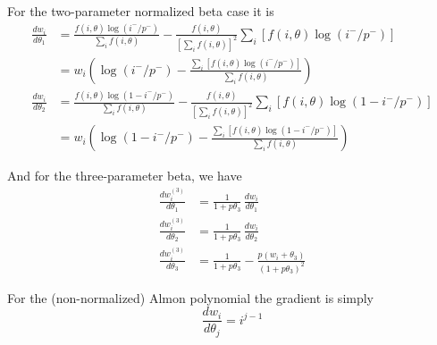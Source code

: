 \documentclass{article}
\begin{document}
For the two-parameter normalized beta case it is
\begin{align*}
\frac{dw_i}{d\theta_1} &=
\frac{f(i,\theta) \log(i^-/p^-)}{\sum_i f(i, \theta)} -
\frac{f(i,\theta)}{\left[\sum_i f(i,\theta)\right]^2}
\sum_i\left[f(i,\theta) \log(i^-/p^-)\right] \\[4pt]
&= w_i \left(\log(i^-/p^-) - 
\frac{\sum_i\left[f(i,\theta) \log(i^-/p^-)\right]}{\sum_i 
 f(i,\theta)}\right) \\[8pt]
\frac{dw_i}{d\theta_2} &=
\frac{f(i,\theta) \log(1 - i^-/p^-)}{\sum_i f(i, \theta)} -
\frac{f(i,\theta)}{\left[\sum_i f(i,\theta)\right]^2}
\sum_i\left[f(i,\theta) \log(1 - i^-/p^-)\right] \\[4pt]
&= w_i \left(\log(1 - i^-/p^-) - 
\frac{\sum_i\left[f(i,\theta) \log(1 - i^-/p^-)\right]}{\sum_i 
 f(i,\theta)}\right)
\end{align*}

And for the three-parameter beta, we have
\begin{align*}
\frac{dw^{(3)}_i}{d\theta_1} &= 
  \frac{1}{1+p\theta_3} \, \frac{dw_i}{d\theta_1} \\
\frac{dw^{(3)}_i}{d\theta_2} &= 
  \frac{1}{1+p\theta_3} \, \frac{dw_i}{d\theta_2} \\
\frac{dw^{(3)}_i}{d\theta_3} &=
\frac{1}{1+p\theta_3} - \frac{p(w_i + \theta_3)}{(1+p\theta_3)^2}
\end{align*}

For the (non-normalized) Almon polynomial the gradient is simply
\[
\frac{dw_i}{d\theta_j} = i^{j-1}
\]
\end{document}
